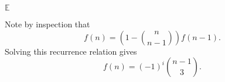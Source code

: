 
\( \mathbb{E} \)


Note by inspection that \[
	f(n) = \left( 1 - \binom{n}{n-1} \right) f(n-1)
.\] Solving this recurrence relation gives \[
	f(n) = (-1)^{i} \binom{n-1}{3}
.\] 

